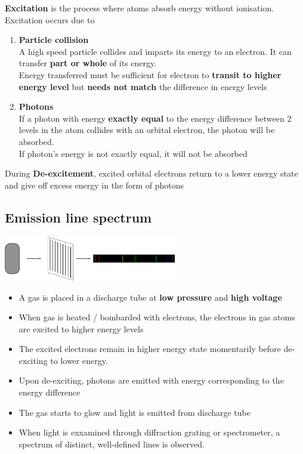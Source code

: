 \documentclass[a4paper, 10pt]{article}
\begin{document}
\textbf{Excitation} is the process where atoms absorb energy without ionisation. Excitation occurs due to 
\begin{enumerate}
   \item \textbf{Particle collision }\\

      A high speed particle collides and imparts its energy to an electron. It can transfer \textbf{part or whole} of its energy. \\

      Energy transferred must be sufficient for electron to \textbf{transit to higher energy level} but \textbf{needs not match} the difference in energy  levels

   \item \textbf{Photons} \\

      If a photon with energy \textbf{exactly equal} to the energy difference between 2 levels in the atom collides with an orbital electron, the photon will be absorbed.  \\

      If photon's energy is not exactly equal, it will not be absorbed
\end{enumerate}	

During \textbf{De-excitement}, excited orbital electrons return to a lower energy state and give off excess energy in the form of photons


\subsection{Emission line spectrum}
\begin{center}
   \includegraphics[width=3in]{figures/8.pdf} 
\end{center}	
\begin{itemize}
   \item A gas is placed in a discharge tube at \textbf{low pressure} and \textbf{high voltage}
   \item When gas is heated / bombarded with electrons, the electrons in gas atoms are excited to higher energy levels
   \item The excited electrons remain in higher energy state momentarily before de-exciting to lower energy.
   \item Upon de-exciting, photons are emitted with energy  corresponding to the energy difference
   \item The gas starts to glow and light is emitted from discharge tube
   \item When light is exxamined through diffraction grating or spectrometer, a spectrum of distinct, well-defined lines is observed.
\end{itemize}	
\end{document}
